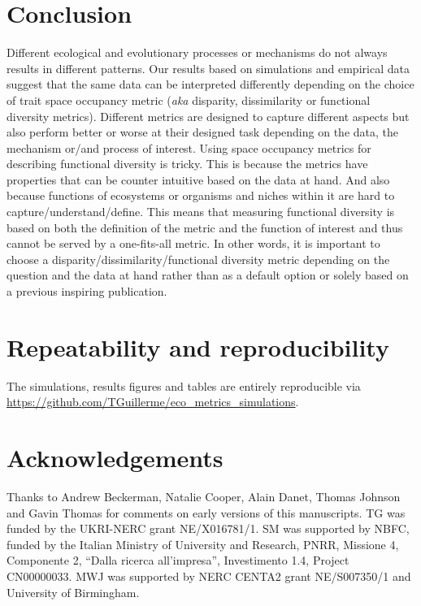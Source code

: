 \documentclass[12pt,letterpaper]{article}
\begin{document}
\section{Conclusion}
Different ecological and evolutionary processes or mechanisms do not always results in different patterns.
Our results based on simulations and empirical data suggest that the same data can be interpreted differently depending on the choice of trait space occupancy metric (\textit{aka} disparity, dissimilarity or functional diversity metrics).
Different metrics are designed to capture different aspects \citep{guillerme2020shifting,mammola2021concepts} but also perform better or worse at their designed task depending on the data, the mechanism or/and process of interest.
Using space occupancy metrics for describing functional diversity is tricky.
This is because the metrics have properties that can be counter intuitive based on the data at hand.
And also because functions of ecosystems or organisms and niches within it are hard to capture/understand/define.
This means that measuring functional diversity is based on both the definition of the metric and the function of interest and thus cannot be served by a one-fits-all metric.
In other words, it is important to choose a disparity/dissimilarity/functional diversity metric depending on the question and the data at hand rather than as a default option or solely based on a previous inspiring publication.


\section{Repeatability and reproducibility}
The simulations, results figures and tables are entirely reproducible via \url{https://github.com/TGuillerme/eco_metrics_simulations}.


\section{Acknowledgements}
Thanks to Andrew Beckerman, Natalie Cooper, Alain Danet, Thomas Johnson and Gavin Thomas for comments on early versions of this manuscripts.
TG was funded by the UKRI-NERC grant NE/X016781/1.
SM was supported by NBFC, funded by the Italian Ministry of University and Research, PNRR, Missione 4, Componente 2, ``Dalla ricerca all'impresa'', Investimento 1.4, Project CN00000033.
MWJ was supported by NERC CENTA2 grant NE/S007350/1 and University of Birmingham.





\end{document}
